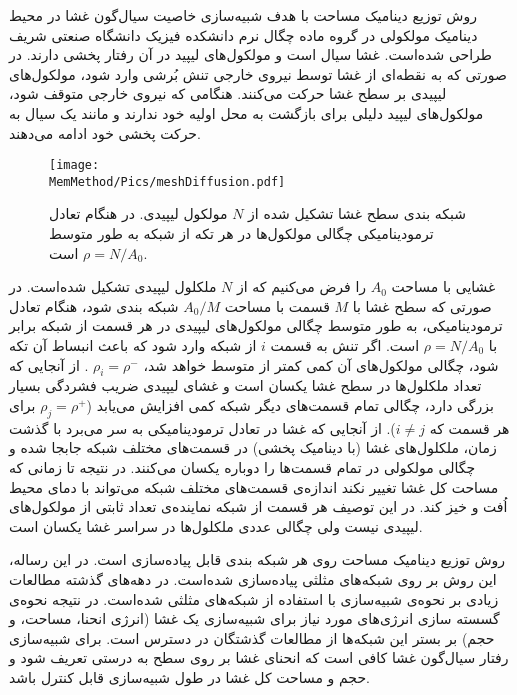 روش توزیع دینامیک مساحت
با هدف  شبیه‌سازی خاصیت سیال‌گون غشا در محیط دینامیک مولکولی در گروه ماده چگال نرم دانشکده فیزیک دانشگاه صنعتی شریف طراحی شده‌است.  غشا سیال است و مولکول‌های لیپید در آن رفتار پخشی دارند. در صورتی که به نقطه‌ای از غشا  توسط نیروی خارجی تنش بُرشی وارد شود، مولکول‌های لیپیدی بر سطح غشا حرکت می‌کنند. هنگامی که نیروی‌ خارجی متوقف شود، مولکول‌های لیپید دلیلی برای بازگشت به محل اولیه خود ندارند و مانند یک سیال به حرکت پخشی خود ادامه می‌دهند. 

\begin{figure}[h]
\begin{center}
\texttt{[image: \\MemMethod/Pics/meshDiffusion.pdf]}
\caption{
شبکه بندی سطح غشا تشکیل شده از 
$N$
مولکول لیپیدی. در هنگام تعادل ترمودینامیکی چگالی مولکول‌ها در هر تکه از شبکه به طور متوسط
$\rho=N/A_0$
است.
}
\label{fig:cylindermesh}
\end{center}
\end{figure}

غشایی با مساحت 
$A_0$
را فرض می‌کنیم که از 
$N$
ملکلول لیپیدی تشکیل شده‌است. در صورتی که سطح غشا با 
$M$
قسمت با مساحت 
$A_0/M$
شبکه بندی شود، هنگام  تعادل ترمودینامیکی، به طور متوسط چگالی مولکول‌های لیپیدی در هر قسمت از شبکه برابر با 
$\rho=N/A_0$
است. اگر تنش  به قسمت
$i$
از شبکه وارد شود که باعث انبساط آن تکه شود، چگالی مولکول‌های آن کمی کمتر از متوسط خواهد شد،
$\rho_i=\rho^-$
. از آنجایی که تعداد ملکلو‌ل‌ها در سطح غشا یکسان است و غشای لیپیدی ضریب فشردگی بسیار بزرگی دارد، چگالی تمام قسمت‌های دیگر شبکه کمی افزایش می‌یابد 
($\rho_j=\rho^+$
برای هر قسمت که
$i\neq j$).
 از آنجایی که غشا در تعادل ترمودینامیکی به سر می‌برد با گذشت زمان،  ملکلول‌های غشا (با دینامیک پخشی) در قسمت‌های مختلف شبکه جابجا شده و چگالی مولکولی در تمام قسمت‌ها را دوباره یکسان می‌کنند. در نتیجه تا زمانی که مساحت کل غشا تغییر نکند اندازه‌ی قسمت‌های مختلف شبکه می‌تواند با دمای محیط اُفت  و خیز کند. در این توصیف هر قسمت از شبکه نماینده‌ی تعداد ثابتی از مولکول‌های لیپیدی نیست ولی چگالی عددی ملکلول‌ها در سراسر غشا یکسان است.

روش توزیع دینامیک مساحت روی هر شبکه‌ بندی قابل پیاده‌سازی است. در این رساله، این روش بر روی شبکه‌های مثلثی پیاده‌سازی شده‌است. در دهه‌های گذشته مطالعات زیادی بر نحوه‌ی شبیه‌سازی با استفاده از شبکه‌های مثلثی شده‌است. در نتیجه نحوه‌ی گسسته سازی انرژی‌های مورد نیاز برای شبیه‌سازی یک غشا (انرژی انحنا، مساحت، و حجم) بر بستر این شبکه‌ها از مطالعات گذشتگان در دسترس است. برای شبیه‌سازی رفتار سیال‌گون غشا کافی ‌است که انحنای غشا بر روی سطح به درستی تعریف شود و حجم و مساحت کل غشا در طول شبیه‌سازی قابل کنترل باشد. 

